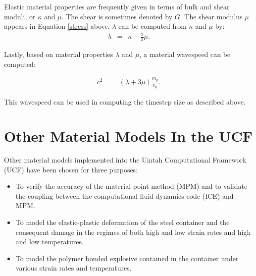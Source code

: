 Elastic material properties are frequently given in terms of 
bulk and shear moduli, or $\kappa$ and $\mu$.  The shear is 
sometimes denoted by $G$.  The shear modulus $\mu$ appears in 
Equation \ref{stress} above.  $\lambda$ can be computed from
$\kappa$ and $\mu$ by:
\begin{eqnarray}
	\lambda &=& \kappa - \frac{2}{3}\mu.
\end{eqnarray}

Lastly, based on material properties $\lambda$ and $\mu$, a material 
wavespeed can be computed:

\begin{eqnarray}
	c^2 &=& (\lambda + 3 \mu)\frac{m_p}{v_p}.
\end{eqnarray}

This wavespeed can be used in computing the timestep size as 
described above.

\section{Other Material Models In the UCF}
Other material models implemented into the Uintah Computational
Framework (UCF) have been chosen for three purposes:
\begin{itemize}
  \item To verify the accuracy of the material point method (MPM)
        and to validate the coupling between the computational fluid 
        dynamics code (ICE) and MPM.
  \item To model the elastic-plastic deformation of the steel
        container and the consequent damage in the regimes of 
        both high and low strain rates and high and low temperatures.
  \item To model the polymer bonded explosive contained in the 
        container under various strain rates and temperatures.
\end{itemize}

